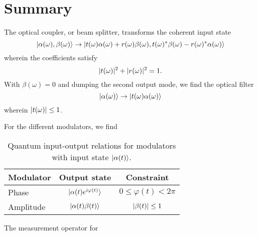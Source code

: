 \section*{Summary}

The optical coupler, or beam splitter, transforms the coherent input state
\begin{equation}
	\lvert\alpha(\omega),\beta(\omega)\rangle
	\to
	\lvert
		t(\omega)\alpha(\omega)+r(\omega)\beta(\omega),
		t(\omega)^*\beta(\omega)-r(\omega)^*\alpha(\omega)
	\rangle
\end{equation}
wherein the coefficients satisfy
\begin{equation}
	\lvert t(\omega)\rvert^2
	+
	\lvert r(\omega)\rvert^2
	=
	1
	.
\end{equation}
With $\beta(\omega)=0$ and dumping the second output mode, we find the optical filter
\begin{equation}
	\lvert\alpha(\omega)\rangle
	\to
	\lvert t(\omega)\alpha(\omega)\rangle
\end{equation}
wherein $\lvert t(\omega)\rvert\leq1$.

For the different modulators, we find
\begin{table}[htb]
	\centering	
	\begin{tabular}{lcc}
		\toprule
			Modulator & Output state & Constraint \\
		\midrule
			Phase & $\lvert\alpha(t)e^{i\varphi(t)}\rangle$ & $0\leq\varphi(t)<2\pi$ \\
			Amplitude & $\lvert\alpha(t)\beta(t)\rangle$ & $\lvert\beta(t)\rvert\leq1$ \\
		\bottomrule
	\end{tabular}
	\caption{Quantum input-output relations for modulators with input state $\lvert\alpha(t)\rangle$.}
\end{table}

The measurement operator for 